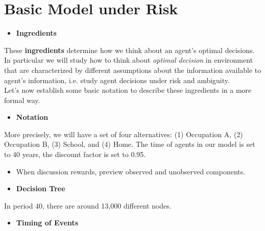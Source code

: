 \section{Basic Model under Risk}

\begin{itemize}
\item[] \textbf{Ingredients}
\end{itemize}

These \textbf{ingredients} determine how we think about an agent's optimal decisions. In particular we will study how to think about \textit{optimal decision} in environment that are characterized by different assumptions about the information available to agent's information, i.e. study agent decisions under risk and ambiguity.\\\newline
%
Let's now establish some basic notation to describe these ingredients in a more formal way.
\begin{itemize}\item[] \textbf{Notation}\end{itemize}
More precisely, we will have a set of four alternatives: (1) Occupation A, (2) Occupation B, (3) School, and (4) Home. The time of agents in our model is set to 40 years, the discount factor is set to 0.95.

\begin{itemize}
\item When discussion rewards, preview observed and unobserved components.
\end{itemize}
\begin{itemize}\item[] \textbf{Decision Tree}\end{itemize}
In period 40, there are around 13,000 different nodes.
\begin{itemize}\item[] \textbf{Timing of Events}\end{itemize}

